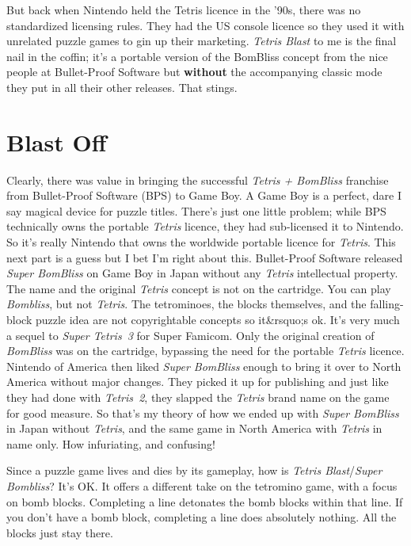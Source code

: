 \documentclass{book}
\begin{document}
But back when Nintendo held the Tetris licence in the ’90s, there was no standardized licensing rules. They had the US console licence so they used it with unrelated puzzle games to gin up their marketing. \emph{Tetris Blast} to me is the final nail in the coffin; it’s a portable version of the BomBliss concept from the nice people at Bullet-Proof Software but \textbf{without} the accompanying classic mode they put in all their other releases. That stings.

\FloatBarrier\needspace{10mm}\section*{Blast Off}\nopagebreak[4]

Clearly, there was value in bringing the successful \emph{Tetris + BomBliss} franchise from Bullet-Proof Software (BPS) to Game Boy. A Game Boy is a perfect, dare I say magical device for puzzle titles. There’s just one little problem; while BPS technically owns the portable \emph{Tetris} licence, they had sub-licensed it to Nintendo. So it’s really Nintendo that owns the worldwide portable licence for \emph{Tetris}. This next part is a guess but I bet I’m right about this. Bullet-Proof Software released \emph{Super BomBliss} on Game Boy in Japan without any \emph{Tetris} intellectual property. The name and the original \emph{Tetris} concept is not on the cartridge. You can play \emph{Bombliss}, but not \emph{Tetris}. The tetrominoes, the blocks themselves, and the falling-block puzzle idea are not copyrightable concepts so it&rsquo;s ok. It’s very much a sequel to \emph{Super Tetris~3} for Super Famicom. Only the original creation of \emph{BomBliss} was on the cartridge, bypassing the need for the portable \emph{Tetris} licence. Nintendo of America then liked \emph{Super BomBliss} enough to bring it over to North America without major changes. They picked it up for publishing and just like they had done with \emph{Tetris~2}, they slapped the \emph{Tetris} brand name on the game for good measure. So that’s my theory of how we ended up with \emph{Super BomBliss} in Japan without \emph{Tetris}, and the same game in North America with \emph{Tetris} in name only. How infuriating, and confusing!

Since a puzzle game lives and dies by its gameplay, how is \emph{Tetris Blast}/\emph{Super Bombliss}? It’s OK. It offers a different take on the tetromino game, with a focus on bomb blocks. Completing a line detonates the bomb blocks within that line. If you don’t have a bomb block, completing a line does absolutely nothing. All the blocks just stay there.
\end{document}
